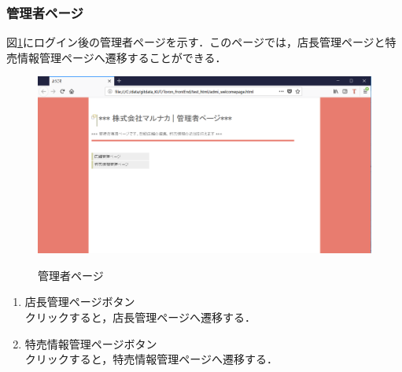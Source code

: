 \documentclass[a4j]{jarticle}
\begin{document}
\subsubsection{管理者ページ}
図\ref{welcome1}にログイン後の管理者ページを示す．このページでは，店長管理ページと特売情報管理ページへ遷移することができる．
\begin{figure}[H]
  \begin{center}
    \includegraphics[width=15cm]{welcome1.png} \\
    \caption{管理者ページ}
    \label{welcome1}
  \end{center}
\end{figure}
\begin{enumerate}
  \renewcommand{\labelenumi}{\textcircled{\scriptsize \theenumi}}
	\item 店長管理ページボタン\\
	クリックすると，店長管理ページへ遷移する．
	\item 特売情報管理ページボタン\\
  クリックすると，特売情報管理ページへ遷移する．
\end{enumerate}
\end{document}
